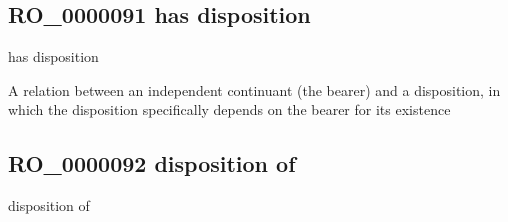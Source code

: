 \documentclass[letterpaper,10pt,english]{sphinxmanual}
\begin{document}
\subsection{RO\_0000091 \sphinxhyphen{} has disposition}
\label{\detokenize{doc-RO_0000091:ro-0000091-has-disposition}}\label{\detokenize{doc-RO_0000091:index-0}}\label{\detokenize{doc-RO_0000091::doc}}
\begin{sphinxShadowBox}

\sphinxAtStartPar
has disposition
\end{sphinxShadowBox}

\begin{sphinxShadowBox}

\sphinxAtStartPar
{\hyperref[\detokenize{doc-RO_0000053::doc}]{}}
\end{sphinxShadowBox}

\begin{sphinxShadowBox}

\sphinxAtStartPar
A relation between an independent continuant (the bearer) and a disposition, in which the disposition specifically depends on the bearer for its existence
\end{sphinxShadowBox}

\begin{sphinxShadowBox}

\sphinxAtStartPar
{}
\end{sphinxShadowBox}
\begin{quote}

\ignorespaces \end{quote}


\subsection{RO\_0000092 \sphinxhyphen{} disposition of}
\label{\detokenize{doc-RO_0000092:ro-0000092-disposition-of}}\label{\detokenize{doc-RO_0000092:index-0}}\label{\detokenize{doc-RO_0000092::doc}}
\begin{sphinxShadowBox}

\sphinxAtStartPar
disposition of
\end{sphinxShadowBox}
\end{document}
